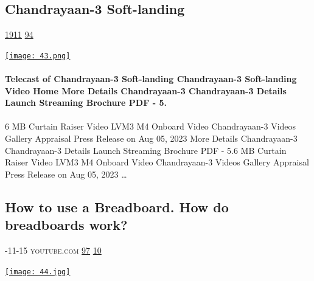 \documentclass[10pt,a4paper]{article}
\begin{document}
\begin{multicols}{2}
\raggedcolumns
\noindent\begin{minipage}{\linewidth}
\medskip
\subsection{Chandrayaan-3 Soft-landing}
\textsc{\footnotesize
{\scriptsize\faThumbsOUp}\space 
\href{http://news.ycombinator.com/item?id=37233936\&utm\_term=comment}{1911} 
{\scriptsize\faComments}\space 
\href{http://news.ycombinator.com/item?id=37233936\&utm\_term=comment}{94} 
}
\par\medskip\noindent
\href{https://www.isro.gov.in/LIVE\_telecast\_of\_Soft\_landing.html?utm\_source=hackernewsletter\&utm\_medium=email\&utm\_term=watching}{
    \texttt{[image: 43.png]}
}
\end{minipage}
\paragraph{}
\textbf{Telecast of Chandrayaan-3 Soft-landing Chandrayaan-3 Soft-landing Video Home More Details Chandrayaan-3 Chandrayaan-3 Details Launch Streaming Brochure PDF - 5.}
\paragraph{}
6 MB Curtain Raiser Video LVM3 M4 Onboard Video Chandrayaan-3 Videos Gallery Appraisal Press Release on Aug 05, 2023 More Details Chandrayaan-3 Chandrayaan-3 Details Launch Streaming Brochure PDF - 5.6 MB Curtain Raiser Video LVM3 M4 Onboard Video Chandrayaan-3 Videos Gallery Appraisal Press Release on Aug 05, 2023
\dots\par
\noindent\begin{minipage}{\linewidth}
\medskip
\subsection{How to use a Breadboard. How do breadboards work?}
\textsc{\footnotesize
{\scriptsize\faCalendar}-11-15 
{\scriptsize\faYoutube}\space 
youtube.com 
{\scriptsize\faThumbsOUp}\space 
\href{http://news.ycombinator.com/item?id=37210146\&utm\_term=comment}{97} 
{\scriptsize\faComments}\space 
\href{http://news.ycombinator.com/item?id=37210146\&utm\_term=comment}{10} 
}
\par\medskip\noindent
\href{https://www.youtube.com/watch?v=BYOiYvdaCis\&utm\_source=hackernewsletter\&utm\_medium=email\&utm\_term=watching}{
    \texttt{[image: 44.jpg]}
}
\end{minipage}

\end{multicols}
\end{document}
